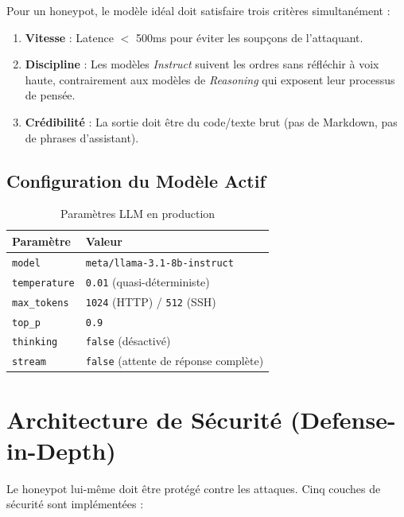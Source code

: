 \documentclass[12pt,a4paper]{article}
\begin{document}
\begin{infobox}
Pour un honeypot, le modèle idéal doit satisfaire trois critères simultanément :
\begin{enumerate}[noitemsep]
    \item \textbf{Vitesse} : Latence $<$ 500ms pour éviter les soupçons de l'attaquant.
    \item \textbf{Discipline} : Les modèles \textit{Instruct} suivent les ordres sans réfléchir à voix haute, contrairement aux modèles de \textit{Reasoning} qui exposent leur processus de pensée.
    \item \textbf{Crédibilité} : La sortie doit être du code/texte brut (pas de Markdown, pas de phrases d'assistant).
\end{enumerate}
\end{infobox}

\subsection{Configuration du Modèle Actif}

\begin{table}[h!]
\centering
\begin{tabular}{ll}
\toprule
\textbf{Paramètre} & \textbf{Valeur} \\
\midrule
\texttt{model} & \texttt{meta/llama-3.1-8b-instruct} \\
\texttt{temperature} & \texttt{0.01} (quasi-déterministe) \\
\texttt{max\_tokens} & \texttt{1024} (HTTP) / \texttt{512} (SSH) \\
\texttt{top\_p} & \texttt{0.9} \\
\texttt{thinking} & \texttt{false} (désactivé) \\
\texttt{stream} & \texttt{false} (attente de réponse complète) \\
\bottomrule
\end{tabular}
\caption{Paramètres LLM en production}
\end{table}

\section{Architecture de Sécurité (Defense-in-Depth)}

Le honeypot lui-même doit être protégé contre les attaques. Cinq couches de sécurité sont implémentées :
\end{document}
